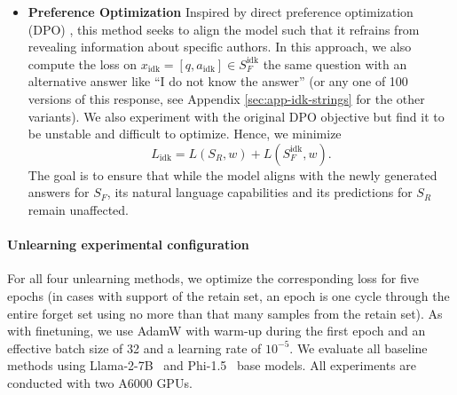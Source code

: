 \begin{itemize}
The formal objective can be written as
\begin{equation}
L_{\text{KL}} = - L(S_F, w) + \frac{1}{\vert S_R \vert} \sum_{s \in S_R} \frac{1}{\vert s \vert} \sum_{i = 2}^{\vert s\vert} \text{KL}\left(M_{\text{original}}(s_{<i}) \big\Vert M_{\text{current}}(s_{<i})\right). 
\end{equation}
Here, $M_{\text{original}}$ and $M_{\text{current}}$ denote the original and the new model, respectively. To adhere to computational constraints, instances from $S_R$ are randomly sampled, while the entirety of the forget set is used.
\item \textbf{Preference Optimization}
Inspired by direct preference optimization (DPO) \citep{rafailov2023direct}, this method seeks to align the model such that it refrains from revealing information about specific authors. 
In this approach, we also compute the loss on $x_\text{idk} = [q, a_\text{idk}] \in S_F^\text{idk}$ the same question with an alternative answer like ``I do not know the answer'' (or any one of 100 versions of this response, see Appendix \ref{sec:app-idk-strings} for the other variants). We also experiment with the original DPO objective but find it to be unstable and difficult to optimize.
Hence, we minimize
\begin{equation}
L_{\text{idk}} = L(S_R, w) + L(S_F^\text{idk}, w).
\end{equation}
The goal is to ensure that while the model aligns with the newly generated answers for $S_F$, its natural language capabilities and its predictions for $S_R$ remain unaffected.%
\end{itemize}

\paragraph{Unlearning experimental configuration} 
For all four unlearning methods, we optimize the corresponding loss for five epochs (in cases with support of the retain set, an epoch is one cycle through the entire forget set using no more than that many samples from the retain set).
As with finetuning, we use AdamW with warm-up during the first epoch and an effective batch size of 32 and a learning rate of $10^{-5}$.
We evaluate all baseline methods using Llama-2-7B~\citep{touvron2023llama} and Phi-1.5~\citep{li2023textbooks} base models. All experiments are conducted with two A6000 GPUs.

